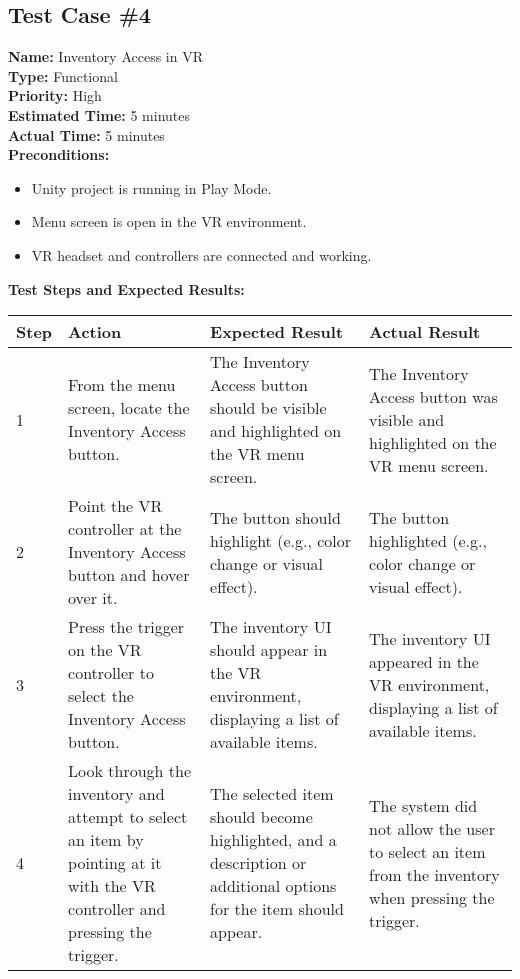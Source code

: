 \documentclass[11pt]{article}
\begin{document}
\subsection{Test Case \#4}
\textbf{Name:} Inventory Access in VR \\
\textbf{Type:} Functional \\
\textbf{Priority:} High \\
\textbf{Estimated Time:} 5 minutes \\
\textbf{Actual Time:} 5 minutes \\
\textbf{Preconditions:} 
\begin{itemize}
\item Unity project is running in Play Mode.
\item Menu screen is open in the VR environment.
\item VR headset and controllers are connected and working.
\end{itemize}
\textbf{Test Steps and Expected Results:} \\
\begin{tabular}{@{} p{0.8cm} p{4.6cm} p{4.6cm} p{4.6cm} @{}}
\toprule
\textbf{Step} & \textbf{Action} & \textbf{Expected Result} & \textbf{Actual Result} \\
\midrule
1 & From the menu screen, locate the Inventory Access button. & The Inventory Access button should be visible and highlighted on the VR menu screen. & The Inventory Access button was visible and highlighted on the VR menu screen. \\
2 & Point the VR controller at the Inventory Access button and hover over it. & The button should highlight (e.g., color change or visual effect). & The button highlighted (e.g., color change or visual effect). \\
3 & Press the trigger on the VR controller to select the Inventory Access button. & The inventory UI should appear in the VR environment, displaying a list of available items. & The inventory UI appeared in the VR environment, displaying a list of available items. \\
4 & Look through the inventory and attempt to select an item by pointing at it with the VR controller and pressing the trigger. & The selected item should become highlighted, and a description or additional options for the item should appear. & The system did not allow the user to select an item from the inventory when pressing the trigger. \\
\bottomrule
\end{tabular}
\end{document}
